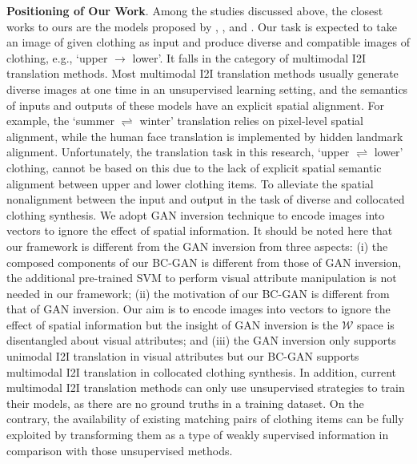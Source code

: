 	\textbf{Positioning of Our Work}. Among the studies discussed above, the closest works to ours are the models proposed by \cite{liu2019toward}, \cite{liu2019collocating}, and \cite{yu2019personalized}. Our task is expected to take an image of given clothing as input and produce diverse and compatible images of clothing, e.g., `upper $\rightarrow$ lower'. It falls in the category of multimodal I2I translation methods. Most multimodal I2I translation methods \cite{huang2018multimodal,lee2018diverse,lee2020drit++,choi2020starganv2,mao2022continuous} usually generate diverse images at one time in an unsupervised learning setting, and the semantics of inputs and outputs of these models have an explicit spatial alignment. For example, the `summer $\rightleftharpoons$ winter' translation \cite{huang2018multimodal,lee2018diverse,lee2020drit++,mao2022continuous} relies on pixel-level spatial alignment, while the human face translation \cite{lee2018diverse,lee2020drit++,choi2020starganv2,mao2022continuous} is implemented by hidden landmark alignment. Unfortunately, the translation task in this research, `upper $\rightleftharpoons$ lower' clothing, cannot be based on this due to the lack of explicit spatial semantic alignment between upper and lower clothing items. To alleviate the spatial nonalignment between the input and output in the task of diverse and collocated clothing synthesis. We adopt GAN inversion technique to encode images into vectors to ignore the effect of spatial information. It should be noted here that our framework is different from the GAN inversion from three aspects: (i) the composed components of our BC-GAN is different from those of GAN inversion, the additional pre-trained SVM \cite{shen2020interfacegan} to perform visual attribute manipulation is not needed in our framework; (ii) the motivation of our BC-GAN is different from that of GAN inversion. Our aim is to encode images into vectors to ignore the effect of spatial information but the insight of GAN inversion is the $\mathcal{W}$ space is disentangled about visual attributes; and (iii) the GAN inversion only supports unimodal I2I translation in visual attributes but our BC-GAN supports multimodal I2I translation in collocated clothing synthesis.
	In addition, current multimodal I2I translation methods can only use unsupervised strategies to train their models, as there are no ground truths in a training dataset. On the contrary, the availability of existing matching pairs of clothing items can be fully exploited by transforming them as a type of weakly supervised information in comparison with those unsupervised methods.
